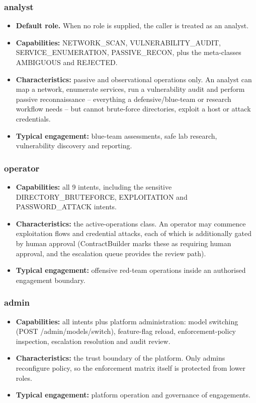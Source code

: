 \documentclass[10pt,journal,onecolumn]{IEEEtran}
\begin{document}
\subsubsection{analyst}

\begin{itemize}
\item \textbf{Default role.} When no role is supplied, the caller is treated as an analyst.
\item \textbf{Capabilities:} NETWORK\_SCAN, VULNERABILITY\_AUDIT, SERVICE\_ENUMERATION, PASSIVE\_RECON, plus the meta-classes AMBIGUOUS and REJECTED.
\item \textbf{Characteristics:} passive and observational operations only. An analyst can map a network, enumerate services, run a vulnerability audit and perform passive reconnaissance -- everything a defensive/blue-team or research workflow needs -- but cannot brute-force directories, exploit a host or attack credentials.
\item \textbf{Typical engagement:} blue-team assessments, safe lab research, vulnerability discovery and reporting.
\end{itemize}

\subsubsection{operator}

\begin{itemize}
\item \textbf{Capabilities:} all 9 intents, including the sensitive DIRECTORY\_BRUTEFORCE, EXPLOITATION and PASSWORD\_ATTACK intents.
\item \textbf{Characteristics:} the active-operations class. An operator may commence exploitation flows and credential attacks, each of which is additionally gated by human approval (ContractBuilder marks these as requiring human approval, and the escalation queue provides the review path).
\item \textbf{Typical engagement:} offensive red-team operations inside an authorised engagement boundary.
\end{itemize}

\subsubsection{admin}

\begin{itemize}
\item \textbf{Capabilities:} all intents plus platform administration: model switching (POST /admin/models/switch), feature-flag reload, enforcement-policy inspection, escalation resolution and audit review.
\item \textbf{Characteristics:} the trust boundary of the platform. Only admins reconfigure policy, so the enforcement matrix itself is protected from lower roles.
\item \textbf{Typical engagement:} platform operation and governance of engagements.
\end{itemize}
\end{document}
